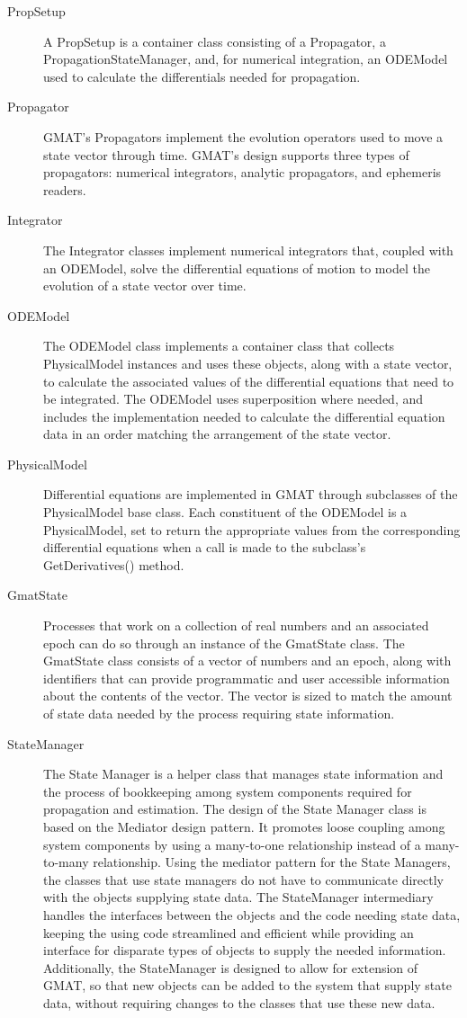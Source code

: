\documentclass[10pt]{article}
\begin{document}
\begin{description}
\item[PropSetup ]  A PropSetup is a container class consisting of a Propagator, a PropagationStateManager, and, for numerical integration, an ODEModel used to calculate the differentials needed for propagation. 
\item[Propagator]  GMAT's Propagators implement the evolution operators used to move a state vector through time.  GMAT's design supports three types of propagators: numerical integrators, analytic propagators, and ephemeris readers.
\item[Integrator]  The Integrator classes implement numerical integrators that, coupled with an ODEModel, solve the differential equations of motion to model the evolution of a state vector over time.
\item[ODEModel]  The ODEModel class implements a container class that collects PhysicalModel instances and uses these objects, along with a state vector, to calculate the associated values of the differential equations that need to be integrated.  The ODEModel uses superposition where needed, and includes the implementation needed to calculate the differential equation data in an order matching the arrangement of the state vector.
\item[PhysicalModel]  Differential equations are implemented in GMAT through subclasses of the PhysicalModel base class.  Each constituent of the ODEModel is a PhysicalModel, set to return the appropriate values from the corresponding differential equations when a call is made to the subclass's GetDerivatives() method.
\item[GmatState]  Processes that work on a collection of real numbers and an associated epoch can do so through an instance of the GmatState class.  The GmatState class consists of a vector of numbers and an epoch, along with identifiers that can provide programmatic and user accessible information about the contents of the vector.  The vector is sized to match the amount of state data needed by the process requiring state information.
\item[StateManager]  The State Manager is a helper class that manages state information and the process of bookkeeping among system components required for propagation and estimation.  The design of the State Manager class is based on the Mediator design pattern\cite{DesignPatterns}.  It promotes loose coupling among system components by using a many-to-one relationship instead of a many-to-many relationship.  Using the mediator pattern for the State Managers, the classes that use state managers do not have to communicate directly with the objects supplying state data.  The StateManager intermediary handles the interfaces between the objects and the code needing state data, keeping the using code streamlined and efficient while providing an interface for disparate types of objects to supply the needed information.  Additionally, the StateManager is designed to allow for extension of GMAT, so that new objects can be added to the system that supply state data, without requiring changes to the classes that use these new data.


\end{description}
\end{document}
